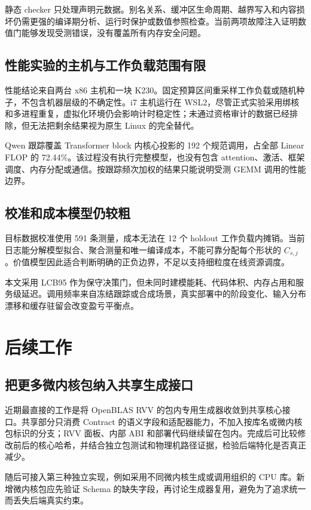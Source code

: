静态 checker 只处理声明元数据。别名关系、缓冲区生命周期、越界写入和内容损坏仍需更强的编译期分析、运行时保护或数值参照检查。当前两项故障注入证明数值门能够发现受测错误，没有覆盖所有内存安全问题。

\subsection{性能实验的主机与工作负载范围有限}

性能结论来自两台 x86 主机和一块 K230。固定预算区间重采样工作负载或随机种子，不包含机器层级的不确定性。i7 主机运行在 WSL2，尽管正式实验采用绑核和多进程重复，虚拟化环境仍会影响计时稳定性；未通过资格审计的数据已经排除，但无法把剩余结果视为原生 Linux 的完全替代。

Qwen 跟踪覆盖 Transformer block 内核心投影的 192 个规范调用，占全部 Linear FLOP 的 72.44\%。该过程没有执行完整模型，也没有包含 attention、激活、框架调度、内存分配或通信。按跟踪频次加权的结果只能说明受测 GEMM 调用的性能边界。

\subsection{校准和成本模型仍较粗}

目标数据校准使用 591 条测量，成本无法在 12 个 holdout 工作负载内摊销。当前日志能分解模型拟合、聚合测量和唯一编译成本，不能可靠分配每个形状的 $C_{s,j}$。价值模型因此适合判断明确的正负边界，不足以支持细粒度在线资源调度。

本文采用 LCB95 作为保守决策门，但未同时建模能耗、代码体积、内存占用和服务级延迟。调用频率来自冻结跟踪或合成场景，真实部署中的阶段变化、输入分布漂移和缓存驻留会改变盈亏平衡点。

\section{后续工作}

\subsection{把更多微内核包纳入共享生成接口}

近期最直接的工作是将 OpenBLAS RVV 的包内专用生成器收敛到共享核心接口。共享部分只消费 Contract 的语义字段和适配器能力，不加入按库名或微内核包标识的分支；RVV 面板、内部 ABI 和部署代码继续留在包内。完成后可比较修改前后的核心哈希，并结合独立包测试和物理机路径证据，检验后端特化是否真正减少。

随后可接入第三种独立实现，例如采用不同微内核生成或调用组织的 CPU 库。新增微内核包应先验证 Schema 的缺失字段，再讨论生成器复用，避免为了追求统一而丢失后端真实约束。

